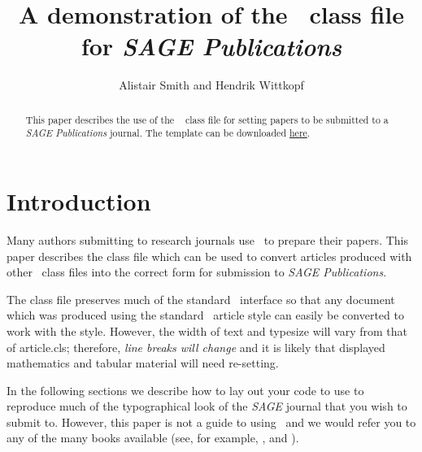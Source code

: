 \documentclass[Afour,sageh,times]{sagej}
\begin{document}

\title{A demonstration of the \LaTeXe\ class file for
\itshape{SAGE Publications}}

\author{Alistair Smith and Hendrik Wittkopf}




\begin{abstract}
This paper describes the use of the \LaTeXe\
\textsf{\journalclass} class file for setting papers to be
submitted to a \textit{SAGE Publications} journal.
The template can be downloaded \href{http://www.uk.sagepub.com/repository/binaries/SAGE LaTeX template.zip}{here}.
\end{abstract}


\maketitle

\section{Introduction}
Many authors submitting to research journals use \LaTeXe\ to
prepare their papers. This paper describes the
\textsf{\journalclass} class file which can be used to convert
articles produced with other \LaTeXe\ class files into the correct
form for submission to \textit{SAGE Publications}.

The \textsf{\journalclass} class file preserves much of the
standard \LaTeXe\ interface so that any document which was
produced using the standard \LaTeXe\ \textsf{article} style can
easily be converted to work with the \textsf{\journalclassshort}
style. However, the width of text and typesize will vary from that
of \textsf{article.cls}; therefore, \textit{line breaks will change}
and it is likely that displayed mathematics and tabular material
will need re-setting.

In the following sections we describe how to lay out your code to
use \textsf{\journalclass} to reproduce much of the typographical look of
the \textit{SAGE} journal that you wish to submit to. However, this paper is not a guide to
using \LaTeXe\ and we would refer you to any of the many books
available (see, for example, \cite{R1}, \cite{R2} and \cite{R3}).
\end{document}
